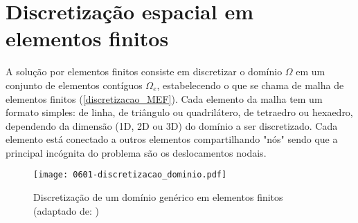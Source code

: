 \section{Discretização espacial em elementos finitos}
\label{cap:Discretização espacial em elementos finitos}
A solução por elementos finitos consiste em discretizar o domínio $\Omega$ em um conjunto de elementos contíguos $\Omega_e$, estabelecendo o que se chama de malha de elementos finitos (\autoref{discretizacao_MEF}). Cada elemento da malha tem um formato simples: de linha, de triângulo ou quadrilátero, de tetraedro ou hexaedro, dependendo da dimensão (1D, 2D ou 3D) do domínio a ser discretizado. Cada elemento está conectado a outros elementos compartilhando "nós" sendo que a principal incógnita do problema são os deslocamentos nodais.
\begin{figure}[H]
	\begin{center}
		\texttt{[image: 0601-discretizacao\_dominio.pdf]}
	\end{center}
	\caption{\label{discretizacao_MEF}Discretização de um domínio genérico em elementos finitos (adaptado de: )}
\end{figure}

